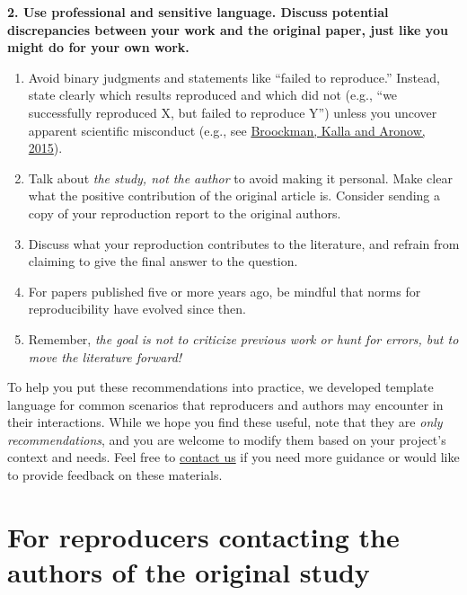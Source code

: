 \documentclass[
]{book}
\providecommand{\tightlist}{%
  \setlength{\itemsep}{0pt}\setlength{\parskip}{0pt}}
\begin{document}
\textbf{2. Use professional and sensitive language. Discuss potential discrepancies between your work and the original paper, just like you might do for your own work.}

\begin{enumerate}
\def\labelenumi{\alph{enumi}.}
\tightlist
\item
  Avoid binary judgments and statements like ``failed to reproduce.'' Instead, state clearly which results reproduced and which did not (e.g., ``we successfully reproduced X, but failed to reproduce Y'') unless you uncover apparent scientific misconduct (e.g., see \href{https://doi.org/10.31222/osf.io/qy2se}{Broockman, Kalla and Aronow, 2015}).\\
\item
  Talk about \emph{the study, not the author} to avoid making it personal. Make clear what the positive contribution of the original article is. Consider sending a copy of your reproduction report to the original authors.\\
\item
  Discuss what your reproduction contributes to the literature, and refrain from claiming to give the final answer to the question.\\
\item
  For papers published five or more years ago, be mindful that norms for reproducibility have evolved since then.\\
\item
  Remember, \emph{the goal is not to criticize previous work or hunt for errors, but to move the literature forward!}
\end{enumerate}

To help you put these recommendations into practice, we developed template language for common scenarios that reproducers and authors may encounter in their interactions. While we hope you find these useful, note that they are \emph{only recommendations}, and you are welcome to modify them based on your project's context and needs. Feel free to \href{mailto:acre@berkeley.edu}{contact us} if you need more guidance or would like to provide feedback on these materials.

\hypertarget{for-reproducers-contacting-the-authors-of-the-original-study}{%
\section{For reproducers contacting the authors of the original study}\label{for-reproducers-contacting-the-authors-of-the-original-study}}
\end{document}
